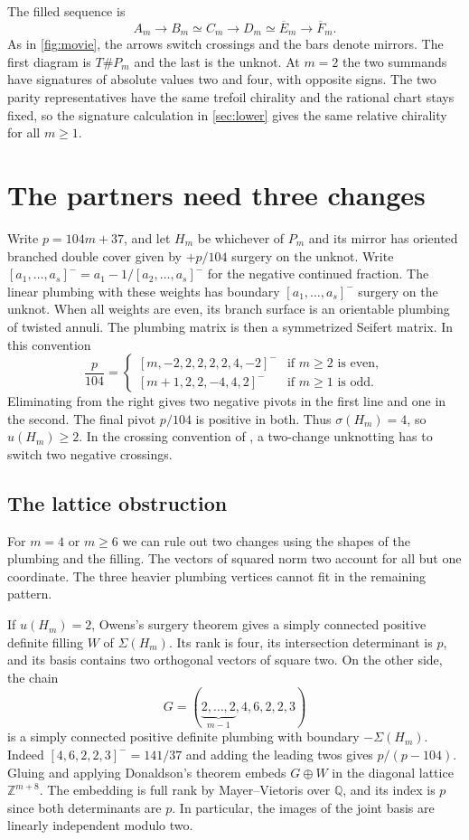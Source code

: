 \documentclass[a4paper,11pt]{amsart}
\numberwithin{equation}{subsection}
\theoremstyle{plain}
\theoremstyle{remark}
\begin{document}
The filled sequence is
\[
A_m\longrightarrow B_m\simeq C_m\longrightarrow D_m
\simeq \overline E_m\longrightarrow\overline F_m .
\]
As in \autoref{fig:movie}, the arrows switch crossings and the bars denote mirrors. The first diagram is $T\#P_m$ and the last is the unknot. At $m=2$ the two summands have signatures of absolute values two and four, with opposite signs. The two parity representatives have the same trefoil chirality and the rational chart stays fixed, so the signature calculation in \autoref{sec:lower} gives the same relative chirality for all $m\geq1$.

\section{The partners need three changes}\label{sec:lower}

Write $p=104m+37$, and let $H_m$ be whichever of $P_m$ and its mirror has oriented branched double cover given by $+p/104$ surgery on the unknot. Write $[a_1,\ldots,a_s]^-=a_1-1/[a_2,\ldots,a_s]^-$ for the negative continued fraction. The linear plumbing with these weights has boundary $[a_1,\ldots,a_s]^-$ surgery on the unknot. When all weights are even, its branch surface is an orientable plumbing of twisted annuli. The plumbing matrix is then a symmetrized Seifert matrix. In this convention
\[
\frac{p}{104}=
\begin{cases}
[m,-2,2,2,2,2,4,-2]^- & \text{if $m\geq 2$ is even},\\
[m+1,2,2,-4,4,2]^- & \text{if $m\geq 1$ is odd}.
\end{cases}
\]
Eliminating from the right gives two negative pivots in the first line and one in the second. The final pivot $p/104$ is positive in both. Thus $\sigma(H_m)=4$, so $u(H_m)\geq 2$. In the crossing convention of \cite{Owens}, a two-change unknotting has to switch two negative crossings.

\subsection{The lattice obstruction}\label{sub:lattice}

For $m=4$ or $m\geq6$ we can rule out two changes using the shapes of the plumbing and the filling. The vectors of squared norm two account for all but one coordinate. The three heavier plumbing vertices cannot fit in the remaining pattern.

If $u(H_m)=2$, Owens's surgery theorem \cite[Theorem~3 and Lemma~2.2]{Owens} gives a simply connected positive definite filling $W$ of $\Sigma(H_m)$. Its rank is four, its intersection determinant is $p$, and its basis contains two orthogonal vectors of square two. On the other side, the chain
\[
G=(\underbrace{2,\ldots,2}_{m-1},4,6,2,2,3)
\]
is a simply connected positive definite plumbing with boundary $-\Sigma(H_m)$. Indeed $[4,6,2,2,3]^-=141/37$ and adding the leading twos gives $p/(p-104)$. Gluing and applying Donaldson's theorem \cite{Donaldson} embeds $G\oplus W$ in the diagonal lattice $\mathbb{Z}^{m+8}$. The embedding is full rank by Mayer--Vietoris over $\mathbb Q$, and its index is $p$ since both determinants are $p$. In particular, the images of the joint basis are linearly independent modulo two.
\end{document}
